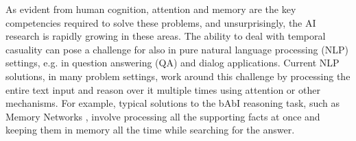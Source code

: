 As evident from human cognition, attention and memory are the key competencies required to solve these problems, and unsurprisingly, the AI research is rapidly growing in these areas.
The ability to deal with temporal casuality can pose a challenge for also in pure natural language processing (NLP) settings, e.g. in question answering (QA) and dialog applications.  
Current NLP solutions, in many problem settings, work around this challenge by processing the entire text input and reason over it multiple times using attention \cite{vaswani2017attention} or other mechanisms.
For example, typical solutions to the bAbI reasoning task, such as Memory Networks \cite{weston2014memory}, involve processing all the supporting facts at once and keeping them in memory all the time while searching for the answer.

